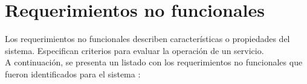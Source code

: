 \section{Requerimientos no funcionales}
Los requerimientos no funcionales describen características o propiedades del sistema. Especifican criterios para evaluar la operación de un servicio.
\\
A continuación, se presenta un listado con los requerimientos no funcionales \citep{RNF1} que fueron identificados para el sistema :
	
	
	
	
	

